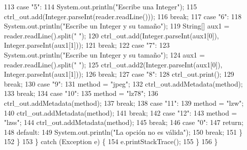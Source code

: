 \begin{DoxyCode}
113                     \textcolor{keywordflow}{case} \textcolor{stringliteral}{"5"}:
114                         System.out.println(\textcolor{stringliteral}{"Escribe una Integer"});
115                         ctrl\_out.add(Integer.parseInt(reader.readLine()));
116                     \textcolor{keywordflow}{break};
117                     \textcolor{keywordflow}{case} \textcolor{stringliteral}{"6"}:
118                         System.out.println(\textcolor{stringliteral}{"Escribe un Integer y su tamaño"});
119                         String[] aux1 = reader.readLine().split(\textcolor{stringliteral}{" "});
120                         ctrl\_out.add(Integer.parseInt(aux1[0]), Integer.parseInt(aux1[1]));
121                     \textcolor{keywordflow}{break};
122                     \textcolor{keywordflow}{case} \textcolor{stringliteral}{"7"}:
123                         System.out.println(\textcolor{stringliteral}{"Escribe un Integer y su tamaño"});
124                         aux1 = reader.readLine().split(\textcolor{stringliteral}{" "});
125                         ctrl\_out.add2(Integer.parseInt(aux1[0]), Integer.parseInt(aux1[1]));
126                     \textcolor{keywordflow}{break};
127                     \textcolor{keywordflow}{case} \textcolor{stringliteral}{"8"}:
128                         ctrl\_out.print();
129                     \textcolor{keywordflow}{break};
130                     \textcolor{keywordflow}{case} \textcolor{stringliteral}{"9"}:
131                         method = \textcolor{stringliteral}{"jpeg"};
132                         ctrl\_out.addMetadata(method);
133                     \textcolor{keywordflow}{break};
134                     \textcolor{keywordflow}{case} \textcolor{stringliteral}{"10"}:
135                         method = \textcolor{stringliteral}{"lz78"};
136                         ctrl\_out.addMetadata(method);
137                     \textcolor{keywordflow}{break};
138                     \textcolor{keywordflow}{case} \textcolor{stringliteral}{"11"}:
139                         method = \textcolor{stringliteral}{"lzw"};
140                         ctrl\_out.addMetadata(method);
141                     \textcolor{keywordflow}{break};
142                     \textcolor{keywordflow}{case} \textcolor{stringliteral}{"12"}:
143                         method = \textcolor{stringliteral}{"lzss"};
144                         ctrl\_out.addMetadata(method);
145                     \textcolor{keywordflow}{break};
146                     \textcolor{keywordflow}{case} \textcolor{stringliteral}{"0"}:
147                         \textcolor{keywordflow}{return};
148                     \textcolor{keywordflow}{default}:
149                         System.out.println(\textcolor{stringliteral}{"La opción no es válida"});
150                     \textcolor{keywordflow}{break};
151                 \}
152             \}
153         \} \textcolor{keywordflow}{catch} (Exception e) \{
154             e.printStackTrace();
155         \}
156     \}
\end{DoxyCode}
